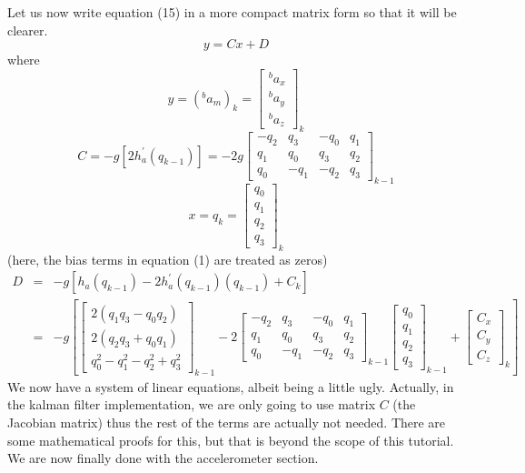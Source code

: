 \documentclass[a4paper,12pt]{book}
\begin{document}
Let us now write equation (15) in a more compact matrix form so that it will be clearer.
\begin{equation}
    y=Cx+D
\end{equation}
where
\begin{equation}
    y = (^ba_m)_k =\begin{bmatrix} ^ba_x \\ ^ba_y \\ ^ba_z \end{bmatrix}_k
\end{equation}
\begin{equation}
    C= -g[2h^\prime_a(q_{k-1})] =-2g\begin{bmatrix} -q_2 & q_3 & -q_0 & q_1 \\ q_1 & q_0 & q_3 & q_2 \\ q_0 & -q_1 & -q_2 & q_3 \end{bmatrix}_{k-1}
\end{equation}
\begin{equation}
    x = q_k =\begin{bmatrix} q_0 \\ q_1 \\ q_2 \\ q_3 \end{bmatrix}_k
\end{equation}
(here, the bias terms in equation (1) are treated as zeros)
\begin{eqnarray}
    D &=& -g[h_a(q_{k-1}) - 2h^\prime_a(q_{k-1})(q_{k-1}) + C_k] \\
    &=& -g\left[\begin{bmatrix} 2(q_1q_3 - q_0q_2) \\ 2(q_2q_3 + q_0q_1) \\ q_0^2 - q_1^2 - q_2^2 + q_3^2 \end{bmatrix}_{k-1} - 2\begin{bmatrix} -q_2 & q_3 & -q_0 & q_1 \\ q_1 & q_0 & q_3 & q_2 \\ q_0 & -q_1 & -q_2 & q_3 \end{bmatrix}_{k-1}\begin{bmatrix} q_0 \\ q_1 \\ q_2 \\ q_3 \end{bmatrix}_{k-1} +\begin{bmatrix} C_x \\ C_y \\ C_z \end{bmatrix}_k \right]
\end{eqnarray}
We now have a system of linear equations, albeit being a little ugly. Actually, in the kalman filter implementation, we are only going to use matrix $C$ (the Jacobian matrix) thus the rest of the terms are actually not needed. There are some mathematical proofs for this, but that is beyond the scope of this tutorial. We are now finally done with the accelerometer section.
\end{document}
